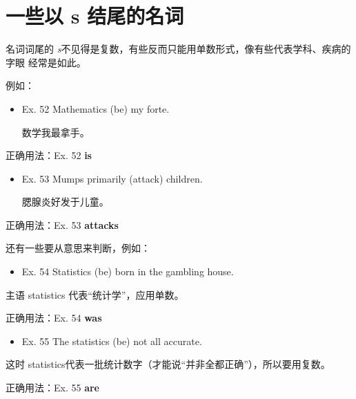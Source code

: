 \section{一些以 s 结尾的名词}

名词词尾的 \emph{s}不见得是复数，有些反而只能用单数形式，像有些代表学科、疾病的字眼
经常是如此。

例如：
\begin{mybox}

\begin{itemize}
\item   Ex. 52 Mathematics (be) my forte.

  数学我最拿手。
\end{itemize}

\tcblower

正确用法：Ex. 52 \textbf{is}
\end{mybox}


\begin{mybox}

\begin{itemize}
\item   Ex. 53 Mumps primarily (attack) children.

  腮腺炎好发于儿童。
\end{itemize}

\tcblower

正确用法：Ex. 53 \textbf{attacks}
\end{mybox}

还有一些要从意思来判断，例如：
\begin{mybox}
\begin{itemize}
\item   Ex. 54 Statistics (be) born in the gambling house.
\end{itemize}

主语 statistics 代表“统计学”，应用单数。

\tcblower

正确用法：Ex. 54 \textbf{was}
\end{mybox}


\begin{mybox}

\begin{itemize}
\item   Ex. 55 The statistics (be) not all accurate.
\end{itemize}

这时 statistics代表一批统计数字（才能说“并非全都正确”），所以要用复数。

\tcblower

正确用法：Ex. 55 \textbf{are}
\end{mybox}

